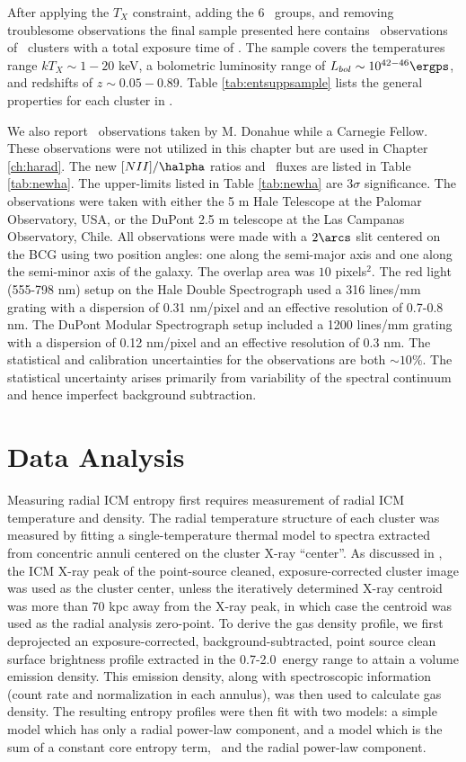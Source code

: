 After applying the $T_X$ constraint, adding the 6 \hifl\ groups, and
removing troublesome observations the final sample presented here
contains \entsuppobs\ observations of \entsuppnum\ clusters with a
total exposure time of \expt. The sample covers the temperatures range
$kT_X \sim 1-20$ keV, a bolometric luminosity range of $L_{bol} \sim
10^{42-46} \ergps$, and redshifts of $z \sim 0.05-0.89$. Table
\ref{tab:entsuppsample} lists the general properties for each cluster
in \accept.

We also report \halpha\ observations taken by M. Donahue while a
Carnegie Fellow. These observations were not utilized in this chapter
but are used in Chapter \ref{ch:harad}. The new $[NII]/\halpha$ ratios
and \halpha\ fluxes are listed in Table \ref{tab:newha}. The
upper-limits listed in Table \ref{tab:newha} are $3\sigma$
significance. The observations were taken with either the 5 m Hale
Telescope at the Palomar Observatory, USA, or the DuPont 2.5 m
telescope at the Las Campanas Observatory, Chile. All observations
were made with a $2\arcs$ slit centered on the BCG using two position
angles: one along the semi-major axis and one along the semi-minor
axis of the galaxy. The overlap area was $10$ pixels$^2$. The red
light (555-798 nm) setup on the Hale Double Spectrograph used a 316
lines/mm grating with a dispersion of 0.31 nm/pixel and an effective
resolution of 0.7-0.8 nm. The DuPont Modular Spectrograph setup
included a 1200 lines/mm grating with a dispersion of 0.12 nm/pixel
and an effective resolution of 0.3 nm. The statistical and calibration
uncertainties for the observations are both $\sim 10\%$. The
statistical uncertainty arises primarily from variability of the
spectral continuum and hence imperfect background subtraction.

\section{Data Analysis}
\label{sec:entsuppdata}

Measuring radial ICM entropy first requires measurement of radial ICM
temperature and density. The radial temperature structure of each
cluster was measured by fitting a single-temperature thermal model to
spectra extracted from concentric annuli centered on the cluster X-ray
``center''. As discussed in \citet{xrayband}, the ICM X-ray peak of
the point-source cleaned, exposure-corrected cluster image was used as
the cluster center, unless the iteratively determined X-ray centroid
was more than 70 kpc away from the X-ray peak, in which case the
centroid was used as the radial analysis zero-point. To derive the gas
density profile, we first deprojected an exposure-corrected,
background-subtracted, point source clean surface brightness profile
extracted in the 0.7-2.0\keV\ energy range to attain a volume emission
density. This emission density, along with spectroscopic information
(count rate and normalization in each annulus), was then used to
calculate gas density. The resulting entropy profiles were then fit
with two models: a simple model which has only a radial power-law
component, and a model which is the sum of a constant core entropy
term, \kna\, and the radial power-law component.

